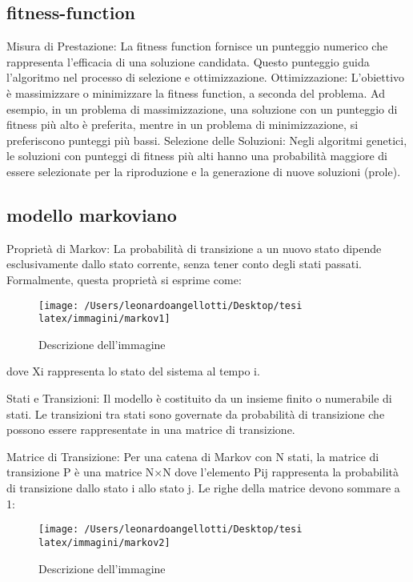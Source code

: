 \documentclass[a4paper,12pt]{report}
\begin{document}
\subsection{fitness-function}
Misura di Prestazione: La fitness function fornisce un punteggio numerico che rappresenta l'efficacia di una soluzione candidata. Questo punteggio guida l'algoritmo nel processo di selezione e ottimizzazione.
Ottimizzazione: L'obiettivo è massimizzare o minimizzare la fitness function, a seconda del problema. Ad esempio, in un problema di massimizzazione, una soluzione con un punteggio di fitness più alto è preferita, mentre in un problema di minimizzazione, si preferiscono punteggi più bassi.
Selezione delle Soluzioni: Negli algoritmi genetici, le soluzioni con punteggi di fitness più alti hanno una probabilità maggiore di essere selezionate per la riproduzione e la generazione di nuove soluzioni (prole).

\subsection{modello markoviano}

Proprietà di Markov: La probabilità di transizione a un nuovo stato dipende esclusivamente dallo stato corrente, senza tener conto degli stati passati. Formalmente, questa proprietà si esprime come:

\begin{figure}[h!]
    \centering
    \texttt{[image: /Users/leonardoangellotti/Desktop/tesi latex/immagini/markov1]} 
    \caption{Descrizione dell'immagine}
    \label{fig:immagine}
\end{figure}

dove Xi rappresenta lo stato del sistema al tempo i.

Stati e Transizioni: Il modello è costituito da un insieme finito o numerabile di stati. Le transizioni tra stati sono governate da probabilità di transizione che possono essere rappresentate in una matrice di transizione.

Matrice di Transizione: Per una catena di Markov con N stati, la matrice di transizione P è una matrice N×N dove l'elemento Pij rappresenta la probabilità di transizione dallo stato i allo stato j. Le righe della matrice devono sommare a 1:

\begin{figure}[h!]
    \centering
    \texttt{[image: /Users/leonardoangellotti/Desktop/tesi latex/immagini/markov2]} 
    \caption{Descrizione dell'immagine}
    \label{fig:immagine}
\end{figure}
\end{document}
